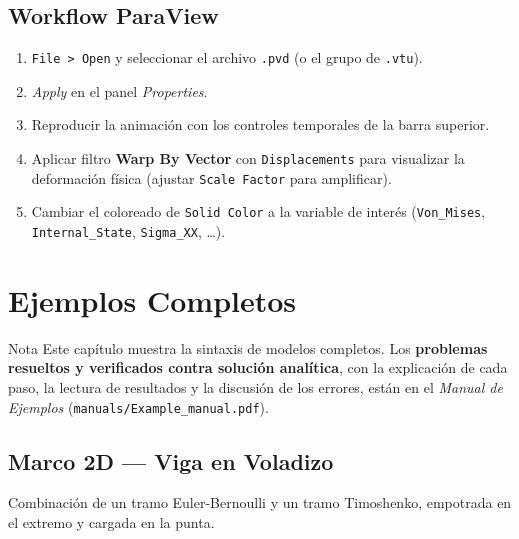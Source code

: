 \documentclass[11pt,oneside]{report}
\begin{document}
\section{Workflow ParaView}

\begin{enumerate}
  \item \texttt{File \textgreater{} Open} y seleccionar el archivo \texttt{.pvd} (o el grupo de \texttt{.vtu}).
  \item \textit{Apply} en el panel \textit{Properties}.
  \item Reproducir la animación con los controles temporales de la barra superior.
  \item Aplicar filtro \textbf{Warp By Vector} con \texttt{Displacements} para visualizar la deformación física (ajustar \texttt{Scale Factor} para amplificar).
  \item Cambiar el coloreado de \texttt{Solid Color} a la variable de interés (\texttt{Von\_Mises}, \texttt{Internal\_State}, \texttt{Sigma\_XX}, \ldots{}).
\end{enumerate}


\newpage

\chapter{Ejemplos Completos}
\label{cap:10}



\begin{infobox}{Nota}
Este capítulo muestra la sintaxis de modelos completos. Los \textbf{problemas resueltos y verificados contra solución analítica}, con la explicación de cada paso, la lectura de resultados y la discusión de los errores, están en el \textit{Manual de Ejemplos} (\texttt{manuals/\allowbreak{}Example\_\allowbreak{}manual.\allowbreak{}pdf}).
\end{infobox}

\section{Marco 2D --- Viga en Voladizo}

Combinación de un tramo Euler-Bernoulli y un tramo Timoshenko, empotrada en el extremo y cargada en la punta.
\end{document}
